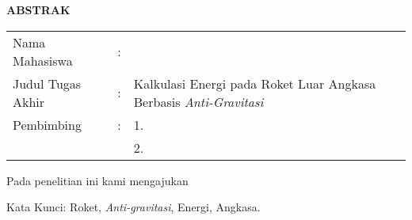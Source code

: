 \begin{center}
  \large\textbf{ABSTRAK}
\end{center}


\vspace{2ex}

\begingroup
\setlength{\tabcolsep}{0pt}

\noindent
\begin{tabularx}{\textwidth}{l >{\centering}m{2em} X}
  Nama Mahasiswa    & : & \name{}                                                                 \\

  Judul Tugas Akhir & : & Kalkulasi Energi pada Roket Luar Angkasa Berbasis \emph{Anti-Gravitasi} \\

  Pembimbing        & : & 1. \advisor{}                                                           \\
                    &   & 2. \coadvisor{}                                                         \\
\end{tabularx}
\endgroup

Pada penelitian ini kami mengajukan \lipsum[1]

Kata Kunci: Roket, \emph{Anti-gravitasi}, Energi, Angkasa.
